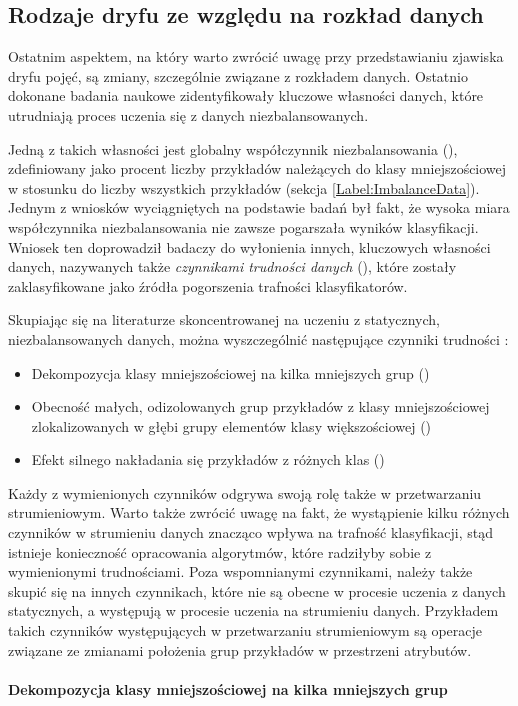 \subsection{Rodzaje dryfu ze względu na rozkład danych}
\label{Section:DriftDataDistribution}

\noindent Ostatnim aspektem, na który warto zwrócić uwagę przy przedstawianiu zjawiska dryfu pojęć, są zmiany, szczególnie związane z rozkładem danych. Ostatnio dokonane badania naukowe zidentyfikowały kluczowe własności danych, które utrudniają proces uczenia się z danych niezbalansowanych.

Jedną z takich własności jest globalny współczynnik niezbalansowania (), zdefiniowany jako procent liczby przykładów należących do klasy mniejszościowej w stosunku do liczby wszystkich przykładów (sekcja \ref{Label:ImbalanceData}). Jednym z wniosków wyciągniętych na podstawie badań był fakt, że wysoka miara współczynnika niezbalansowania nie zawsze pogarszała wyników klasyfikacji. Wniosek ten doprowadził badaczy do wyłonienia innych, kluczowych własności danych, nazywanych także \textit{czynnikami trudności danych} (), które zostały zaklasyfikowane jako źródła pogorszenia trafności klasyfikatorów.

Skupiając się na literaturze skoncentrowanej na uczeniu z statycznych, niezbalansowanych danych, można wyszczególnić następujące czynniki trudności \cite{Book:DataDistribution}\cite{Article:DataDistribution}:

\begin{itemize}
    \item Dekompozycja klasy mniejszościowej na kilka mniejszych grup ()
    \item Obecność małych, odizolowanych grup przykładów z klasy mniejszościowej zlokalizowanych w głębi grupy elementów klasy większościowej ()
    \item Efekt silnego nakładania się przykładów z różnych klas ()
\end{itemize}

\noindent Każdy z wymienionych czynników odgrywa swoją rolę także w przetwarzaniu strumieniowym. Warto także zwrócić uwagę na fakt, że wystąpienie kilku różnych czynników w strumieniu danych znacząco wpływa na trafność klasyfikacji, stąd istnieje konieczność opracowania algorytmów, które radziłyby sobie z wymienionymi trudnościami. Poza wspomnianymi czynnikami, należy także skupić się na innych czynnikach, które nie są obecne w procesie uczenia z danych statycznych, a występują w procesie uczenia na strumieniu danych. Przykładem takich czynników występujących w przetwarzaniu strumieniowym są operacje związane ze zmianami położenia grup przykładów w przestrzeni atrybutów.\\\\
\textbf{Dekompozycja klasy mniejszościowej na kilka mniejszych grup}\\

